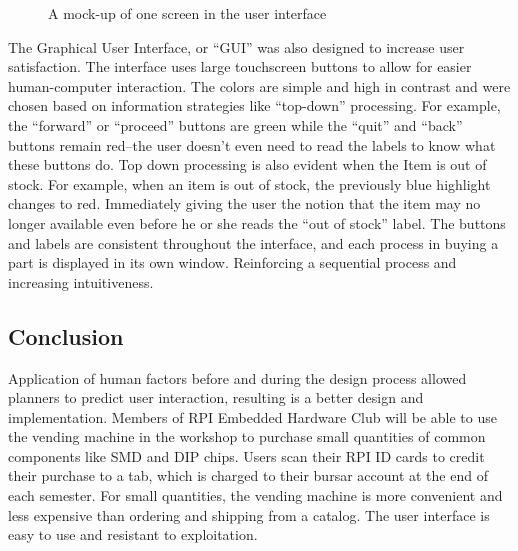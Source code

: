\documentclass[12pt,oneside,final]{article}
\begin{document}
\begin{figure}[t]%
  \centering%
  \label{fig:gui}%
  \caption{A mock-up of one screen in the user interface}%
\end{figure}

The Graphical User Interface, or ``GUI'' was also designed to increase user satisfaction. The interface uses large touchscreen buttons to allow for easier human-computer interaction. The colors are simple and high in contrast and were chosen based on information strategies like ``top-down'' processing. For example, the ``forward'' or ``proceed'' buttons are green while the ``quit'' and ``back'' buttons remain red--the user doesn't even need to read the labels to know what these buttons do. Top down processing is also evident when the Item is out of stock. For example, when an item is out of stock, the previously blue highlight changes to red. Immediately giving the user the notion that the item may no longer available even before he or she reads the ``out of stock'' label. The buttons and labels are consistent throughout the interface, and each process in buying a part is displayed in its own window. Reinforcing a sequential process and increasing intuitiveness.

\subsection{Conclusion}
Application of human factors before and during the design process allowed planners to predict user interaction, resulting is a better design and implementation. Members of RPI Embedded Hardware Club will be able to use the vending machine in the workshop to purchase small quantities of common components like SMD and DIP chips. Users scan their RPI ID cards to credit their purchase to a tab, which is charged to their bursar account at the end of each semester. For small quantities, the vending machine is more convenient and less expensive than ordering and shipping from a catalog. The user interface is easy to use and resistant to exploitation.
\end{document}
